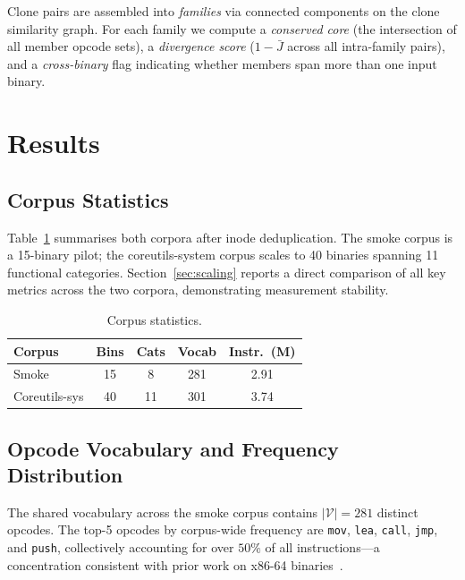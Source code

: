 \documentclass[10pt,twocolumn]{article}
\begin{document}
Clone pairs are assembled into \emph{families} via connected components on
the clone similarity graph.  For each family we compute a \emph{conserved
core} (the intersection of all member opcode sets), a \emph{divergence
score} ($1 - \bar{J}$ across all intra-family pairs), and a \emph{cross-binary}
flag indicating whether members span more than one input binary.

\section{Results}
\label{sec:results}

\subsection{Corpus Statistics}

Table~\ref{tab:corpus} summarises both corpora after inode deduplication.
The smoke corpus is a 15-binary pilot; the coreutils-system corpus
scales to 40 binaries spanning 11 functional categories.
Section~\ref{sec:scaling} reports a direct comparison of all key metrics
across the two corpora, demonstrating measurement stability.

\begin{table}[h]
\centering
\caption{Corpus statistics.}
\label{tab:corpus}
\small
\begin{tabular}{@{}lcccc@{}}
\toprule
\textbf{Corpus} & \textbf{Bins} & \textbf{Cats} & \textbf{Vocab} & \textbf{Instr.\ (M)} \\
\midrule
Smoke            & 15  & 8   & 281 & 2.91 \\
Coreutils-sys    & 40  & 11  & 301 & 3.74 \\
\bottomrule
\end{tabular}
\end{table}

\subsection{Opcode Vocabulary and Frequency Distribution}

The shared vocabulary across the smoke corpus contains $|\mathcal{V}| = 281$
distinct opcodes.  The top-5 opcodes by corpus-wide frequency are
\texttt{mov}, \texttt{lea}, \texttt{call}, \texttt{jmp}, and \texttt{push},
collectively accounting for over $50\%$ of all instructions---a concentration
consistent with prior work on x86-64 binaries~\cite{bilar2007opcodes}.
\end{document}
